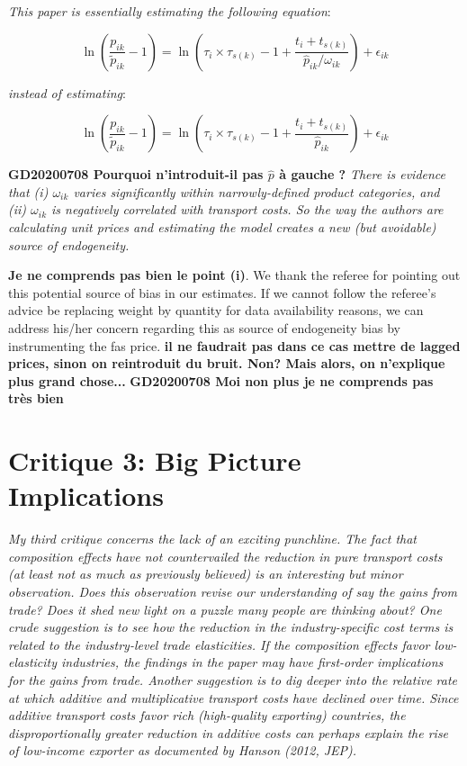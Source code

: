 \documentclass[a4paper,12pt]{article}
\begin{document}
\textit{This paper is essentially estimating the following equation}:

\begin{equation*}
\ln\left(\frac{p_{ik}}{\widetilde{p}_{ik}}-1 \right)= \ln \left(\tau_{i} \times \tau_{s(k)} -1 +\frac{t_{i} + t_{s(k)}}{\widehat{p}_{ik}/\omega_{ik}} \right) + \epsilon_{ik}
\end{equation*}

\textit{instead of estimating}:


\begin{equation*}
\ln\left(\frac{p_{ik}}{\widetilde{p}_{ik}}-1 \right)= \ln \left(\tau_{i} \times \tau_{s(k)}-1 +\frac{t_{i} + t_{s(k)}}{\widehat{p}_{ik}} \right) + \epsilon_{ik}
\end{equation*}

\textbf{GD20200708 Pourquoi n’introduit-il pas $\widehat{p}$ à gauche ?}
\textit{There is evidence that (i) $\omega_{ik}$ varies significantly within narrowly-defined product
categories, and (ii) $\omega_{ik}$ is negatively correlated with transport costs. So the
way the authors are calculating unit prices and estimating the model creates a
new (but avoidable) source of endogeneity.}


\textbf{Je ne comprends pas bien le point (i)}. We thank the referee for pointing out this potential source of bias in our estimates. If we cannot follow the referee's advice be replacing weight by quantity for data availability reasons, we can address his/her concern regarding this as source of endogeneity bias by instrumenting the fas price. \textbf{il ne faudrait pas dans ce cas mettre de lagged prices, sinon on reintroduit du bruit. Non? Mais alors, on n'explique plus grand chose... }
\textbf{GD20200708 Moi non plus je ne comprends pas très bien}

\section{Critique 3: Big Picture Implications}

\textit{My third critique concerns the lack of an exciting punchline. The fact that
composition effects have not countervailed the reduction in pure transport costs
(at least not as much as previously believed) is an interesting but minor observation.
Does this observation revise our understanding of say the gains from
trade? Does it shed new light on a puzzle many people are thinking about?
One crude suggestion is to see how the reduction in the industry-specific cost
terms is related to the industry-level trade elasticities. If the composition effects
favor low-elasticity industries, the findings in the paper may have first-order
implications for the gains from trade.
Another suggestion is to dig deeper into the relative rate at which additive
and multiplicative transport costs have declined over time. Since additive transport
costs favor rich (high-quality exporting) countries, the disproportionally
greater reduction in additive costs can perhaps explain the rise of low-income
exporter as documented by Hanson (2012, JEP).}
\end{document}
